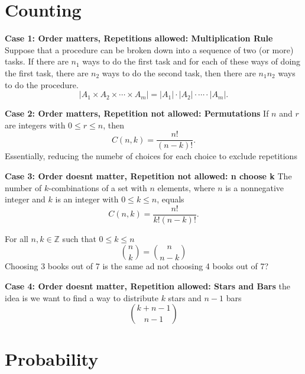 \documentclass{article}
\begin{document}
\section{Counting}
\begin{theorem}
    \textbf{Case 1: Order matters, Repetitions allowed: Multiplication Rule}
    Suppose that a procedure can be broken down into a sequence of two (or more) tasks. 
    If there are $n_1$ ways to do the first task and for each of these ways of doing the first task, 
    there are $n_2$ ways to do the second task, then there are $n_1 n_2$ ways to do the procedure.
    \[
    |A_1 \times A_2 \times \cdots \times A_m| = |A_1| \cdot |A_2| \cdot \cdots \cdot |A_m|.
    \]
\end{theorem}
\begin{theorem}
    \textbf{Case 2: Order matters, Repetition not allowed: Permutations}
    If $n$ and $r$ are integers with $0 \leq r \leq n$, then 
    \[
    C(n, k) = \frac{n!}{(n - k)!}.
    \]
    Essentially, reducing the numebr of choices for each choice to exclude repetitions
\end{theorem}
\begin{theorem}
    \textbf{Case 3: Order doesnt matter, Repetition not allowed: n choose k}
    The number of $k$-combinations of a set with $n$ elements, where $n$ is a nonnegative integer and $k$ is an integer with $0 \leq k \leq n$, equals
    \[
    C(n, k) = \frac{n!}{k!(n - k)!}.
    \]
\end{theorem}
\begin{proposition}
    For all \( n, k \in \mathbb{Z} \) such that $0 \leq k \leq n$
    \[
    \binom{n}{k} = \binom{n}{n - k}
    \]
    Choosing 3 books out of 7 is the same ad not choosing 4 books out of 7?
\end{proposition}
\begin{theorem}
    \textbf{Case 4: Order doesnt matter, Repetition allowed: Stars and Bars}
    the idea is we want to find a way to distribute \(k\) stars and \(n-1\) bars
    \[
    \binom{k + n - 1}{n - 1} 
    \]
\end{theorem}

\section{Probability}
\end{document}
